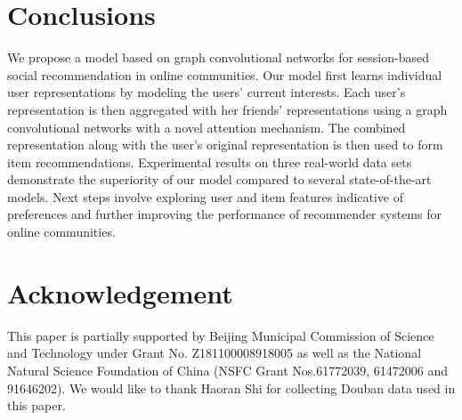\documentclass[sigconf]{acmart}
\begin{document}
 \section{Conclusions}
We propose a model based on graph convolutional networks for session-based social recommendation in online communities. Our model first learns individual user representations by modeling the users' current interests. Each user's representation is then aggregated with her friends' representations using a graph convolutional networks with a novel attention mechanism. The combined representation along with the user's original representation is then used to form item recommendations. Experimental results on three real-world data sets demonstrate the superiority of our model compared to several state-of-the-art models. Next steps involve exploring user and item features indicative of preferences and further improving the performance of recommender systems for online communities.
 \section{Acknowledgement}
This paper is partially supported by Beijing Municipal Commission of Science and Technology under Grant No. Z181100008918005 as well as the National Natural Science Foundation of China (NSFC Grant Nos.61772039, 61472006 and 91646202). We would like to thank Haoran Shi for collecting Douban data used in this paper.
 


\end{document}
